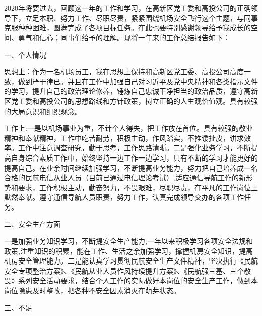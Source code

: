 \documentclass[a4paper,utf8,12pt]{ctexart}%
\newcommand{\fs}{\CJKfamily{fs}}
\begin{document}
\pagestyle{empty} %
\thispagestyle{empty}  %
\begin{center}
{\heiti{}}\\ %
~\\[2pt] %
\end{center}

\fangsong {}  2020年将要过去，回顾这一年的工作和学习，在高新区党工委和高投公司的正确领导下，立足本职、努力工作、尽职尽责，紧紧围绕机场安全飞行这个主题，与同事克服种种困难，圆满完成了各项目标任务。在此也要特别感谢领导给予我成长的空间、勇气和信心；同事们给予的理解。现将一年来的工作总结报告如下：

{\heiti 一、个人情况}\par %

 思想上：作为一名机场员工，我在思想上保持和高新区党工委、高投公司高度一致，做到严于律已。并且在工作中加强自己对习近平及党中央精神和各类指示文件的学习，提升自己的政治理论修养，锤炼自己忠诚干净担当的政治品质，遵守高新区党工委和高投公司的思想路线和方针政策，树立正确的人生观价值观。具有较强的大局意识和组织观念。\par
工作上:一是以机场事业为重，不计个人得失，把工作放在首位。具有较强的敬业精神和奉献精神，工作中吃苦耐劳，积极主动，作风踏实，不推诿扯皮，讲求效率。工作中注意调查研究，勤于思考，工作思路清晰。二是强化业务学习，不断提高自身综合素质工作中，始终坚持一边工作一边学习，只有不断的学习才能更好的提高自己。在业余时间继续加强学习，不断提高业务能力，努力把自己培养成一名合格的民航电信从业人员（目前已通过电信理论考试）,适应通信导航工作的新形势和要求，工作积极主动，勤奋努力，不畏艰难，尽职尽责，在平凡的工作岗位上默然奉献。遵守通信导航人员职责，努力工作，认真完成领导交办的各项工作任务。

{\heiti 二、安全生产方面}

一是加强业务知识学习，不断提安全生产能力,一年以来积极学习各项安全法规和政策,注重知识的积累，能在工作、生活之余加强学习，撑握机房安全知识，提高机房安全管理能力。二是能认真学习贯彻民航安全生产文件精神，坚决执行《民航安全专项整治方案》、《民航从业人员作风持续提升方案》、《民航强三基、三个敬畏》系列安全活动要求，结合个人工作的实际做好本岗位的安全生产工作，做到本岗位隐患及时整改，把各种不安全因素消灭在萌芽状态。

{\heiti 三、不足}
\end{document}
